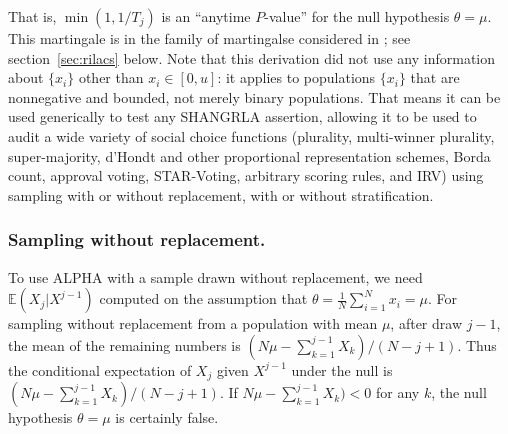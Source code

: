 \documentclass[12pt,runningheads]{llncs}
\newcommand{\EE}{\mathbb{E}}
\begin{document}
{That is, $\min(1, 1/T_j)$ is an ``anytime $P$-value'' for the null hypothesis $\theta = \mu$.
This martingale is in the family of martingalse considered in \cite{waudby-smithEtal21}; see section~\ref{sec:rilacs} below.
Note that this derivation did not use any information about $\{x_i\}$ other than $x_i \in [0, u]$:
it applies to populations $\{x_i\}$ that are nonnegative and bounded, not merely binary populations.
That means it can be used generically to test any SHANGRLA assertion, allowing it to be used to audit
a wide variety of social choice functions (plurality, multi-winner plurality, super-majority, d'Hondt and other
proportional representation schemes, Borda count, approval voting, STAR-Voting, arbitrary scoring rules, and IRV)
using sampling with or without replacement, with or without stratification.

\subsubsection{Sampling without replacement.}
To use ALPHA with a sample drawn without replacement, we need $\EE(X_j | X^{j-1})$ computed on the assumption that
$\theta =  \frac{1}{N} \sum_{i=1}^N x_i = \mu$.
For sampling without replacement from a population with mean $\mu$, after draw $j-1$, the mean of the remaining numbers is $(N\mu - \sum_{k=1}^{j-1}X_k)/(N-j+1)$.
Thus the conditional expectation of $X_j$ given $X^{j-1}$ under the null is $(N\mu - \sum_{k=1}^{j-1}X_k)/(N-j+1)$.
If $N\mu - \sum_{k=1}^{j-1}X_k) < 0$ for any $k$, the null hypothesis $\theta = \mu$ is certainly false.

}
\end{document}
